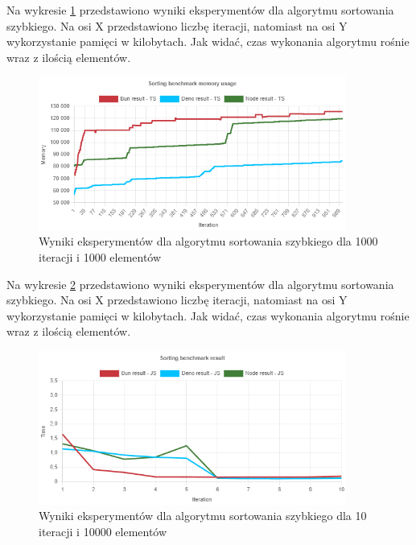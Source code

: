 Na wykresie \ref{fig:radix_sorting_e3_memory_ts} przedstawiono wyniki eksperymentów dla algorytmu sortowania szybkiego. Na osi X przedstawiono liczbę iteracji, natomiast na osi Y wykorzystanie pamięci w kilobytach. Jak widać, czas wykonania algorytmu rośnie wraz z ilością elementów.
\begin{figure}[H]
  \centering
  \includegraphics[width=0.9\textwidth]{Figures/sorting/radix/e3_memory_ts.png}
  \caption{Wyniki eksperymentów dla algorytmu sortowania szybkiego dla 1000 iteracji i 1000 elementów}
  \label{fig:radix_sorting_e3_memory_ts}
\end{figure}

Na wykresie \ref{fig:radix_sorting_e4} przedstawiono wyniki eksperymentów dla algorytmu sortowania szybkiego. Na osi X przedstawiono liczbę iteracji, natomiast na osi Y wykorzystanie pamięci w kilobytach. Jak widać, czas wykonania algorytmu rośnie wraz z ilością elementów.
\begin{figure}[H]
  \centering
  \includegraphics[width=0.9\textwidth]{Figures/sorting/radix/e4_js.png}
  \caption{Wyniki eksperymentów dla algorytmu sortowania szybkiego dla 10 iteracji i 10000 elementów}
  \label{fig:radix_sorting_e4}
\end{figure}

